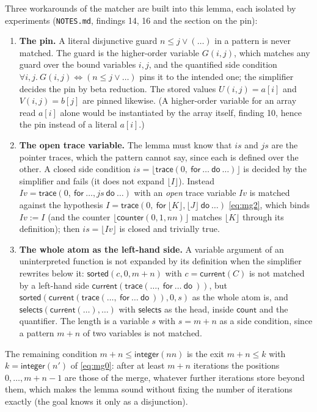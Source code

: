 \documentclass[11pt,a4paper]{article}
\newcommand{\bl}[1]{\lfloor #1\rfloor}                       %
\newcommand{\tr}[3]{\mathsf{trace}(#1,\ \mathsf{for}\ #2\ \mathsf{do}\ #3)}
\newcommand{\cnt}{\mathsf{counter}}
\newcommand{\cur}{\mathsf{current}}
\newcommand{\intf}{\mathsf{integer}}
\newcommand{\sorted}{\mathsf{sorted}}
\begin{document}
Three workarounds of the matcher are built into this lemma, each isolated by experiments
(\texttt{NOTES.md}, findings 14, 16 and the section on the pin):
\begin{enumerate}[nosep]
\item \textbf{The pin.} A literal disjunctive guard $n \le j \vee (\ldots)$ in a pattern is never
  matched. The guard is the higher-order variable $G(i, j)$, which matches any guard over the bound
  variables $i, j$, and the quantified side condition
  $\forall i, j.\ G(i, j) \Leftrightarrow (n \le j \vee \ldots)$ pins it to the intended one; the simplifier
  decides the pin by beta reduction. The stored values $U(i, j) = a[i]$ and $V(i, j) = b[j]$ are pinned
  likewise. (A higher-order variable for an array read $a[i]$ alone would be instantiated by the array
  itself, finding 10, hence the pin instead of a literal $a[i]$.)
\item \textbf{The open trace variable.} The lemma must know that $is$ and $js$ are the pointer traces,
  which the pattern cannot say, since each is defined over the other. A closed side condition
  $is = \bl{\tr{0}{\ldots}{\ldots}}$ is decided by the simplifier and fails (it does not expand $\bl{I}$).
  Instead $Iv = \tr{0}{\ldots, js}{\ldots}$ with an \emph{open} trace variable $Iv$ is matched against
  the hypothesis $I = \tr{0}{\bl{K}, \bl{J}}{\ldots}$ \eqref{eq:mg2}, which binds $Iv := I$ (and the
  counter $\bl{\cnt(0, 1, nn)}$ matches $\bl{K}$ through its definition); then $is = \bl{Iv}$ is closed
  and trivially true.
\item \textbf{The whole atom as the left-hand side.} A variable argument of an uninterpreted function
  is not expanded by its definition when the simplifier rewrites below it: $\sorted(c, 0, m + n)$ with
  $c = \cur(C)$ is not matched by a left-hand side $\cur(\tr{\ldots}{\ldots})$, but
  $\sorted(\cur(\tr{\ldots}{\ldots}), 0, s)$ as the whole atom is, and $\mathsf{selects}(\cur(\ldots), \ldots)$
  with $\mathsf{selects}$ as the head, inside $\mathsf{count}$ and the quantifier. The length is a
  variable $s$ with $s = m + n$ as a side condition, since a pattern $m + n$ of two variables is not matched.
\end{enumerate}
The remaining condition $m + n \le \intf(nn)$ is the exit $m + n \le k$ with $k = \intf(n')$ of
\eqref{eq:mg0}: after at least $m + n$ iterations the positions $0, \ldots, m + n - 1$ are those of the
merge, whatever further iterations store beyond them, which makes the lemma sound without fixing the
number of iterations exactly (the goal knows it only as a disjunction).
\end{document}
